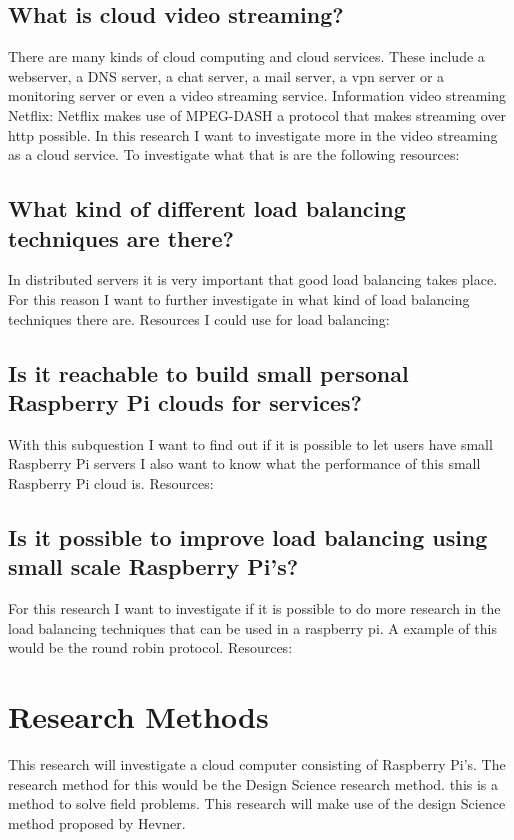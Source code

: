 \documentclass{sig-alternate-br}
\begin{document}
\subsection{What is cloud video streaming?}
There are many kinds of cloud computing and cloud services. These include a webserver, a DNS server, a chat server, a mail server, a vpn server or a monitoring server or even a video streaming service. 
Information video streaming Netflix:
\cite{volkskrant, Adhikari:2012}
Netflix makes use of MPEG-DASH a protocol that makes streaming over http possible. In this research I want to investigate more in the video streaming as a cloud service.  To investigate what that is are the following resources:
\cite{g-streamer,raspberry-video,video-1080p, plissonneau:2012}
 
\subsection{What kind of different load balancing techniques are there?}
In distributed servers it is very important that good load balancing takes place. For this reason I want to further investigate in what kind of load balancing techniques there are. Resources I could use for load balancing:
\cite{nginx-load-balancing,nginx-load-balancing-2,computer-networking,wolf:1997,load-balancing}

 
\subsection{Is it reachable to build small personal Raspberry Pi clouds for services?}
With this subquestion I want to find out if it is possible to let users have small Raspberry Pi servers I also want to know what the performance of this small Raspberry Pi cloud is. 
Resources:
\cite{Pcextreme,nginx-load-balancing,nginx-load-balancing-2}

\subsection{Is it possible to improve load balancing using small scale Raspberry Pi's?}
For this research I want to investigate if it is possible to do more research in the 
load balancing techniques that can be used in a raspberry pi. A example of this would be the round robin protocol.
Resources:
\cite{nginx-load-balancing,nginx-load-balancing-2}

\section{Research Methods}
This research will investigate a cloud computer consisting of Raspberry Pi's. The research method for this would be the Design Science research method. this is a method to solve field problems. This research will make use of the design Science method proposed by Hevner\cite{hevner:2007}.
\end{document}
